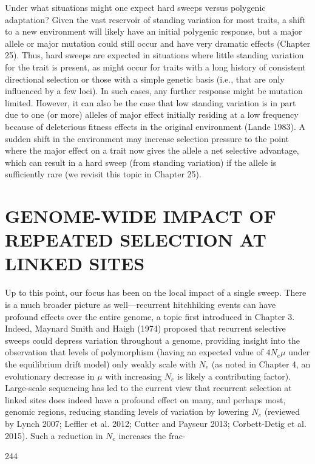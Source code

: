 \documentclass{article}
\begin{document}
Under what situations might one expect hard sweeps versus polygenic adaptation? Given the vast reservoir of standing variation for most traits, a shift to a new environment will likely have an initial polygenic response, but a major allele or major mutation could still occur and have very dramatic effects (Chapter 25). Thus, hard sweeps are expected in situations where little standing variation for the trait is present, as might occur for traits with a long history of consistent directional selection or those with a simple genetic basis (i.e., that are only influenced by a few loci). In such cases, any further response might be mutation limited. However, it can also be the case that low standing variation is in part due to one (or more) alleles of major effect initially residing at a low frequency because of deleterious fitness effects in the original environment (Lande 1983). A sudden shift in the environment may increase selection pressure to the point where the major effect on a trait now gives the allele a net selective advantage, which can result in a hard sweep (from standing variation) if the allele is sufficiently rare (we revisit this topic in Chapter 25).

\section{GENOME-WIDE IMPACT OF REPEATED SELECTION AT LINKED SITES}
Up to this point, our focus has been on the local impact of a single sweep. There is a much broader picture as well—recurrent hitchhiking events can have profound effects over the entire genome, a topic first introduced in Chapter 3. Indeed, Maynard Smith and Haigh (1974) proposed that recurrent selective sweeps could depress variation throughout a genome, providing insight into the observation that levels of polymorphism (having an expected value of  $ 4N_{e}\mu $ under the equilibrium drift model) only weakly scale with  $ N_{e} $ (as noted in Chapter 4, an evolutionary decrease in  $ \mu $ with increasing  $ N_{e} $ is likely a contributing factor). Large-scale sequencing has led to the current view that recurrent selection at linked sites does indeed have a profound effect on many, and perhaps most, genomic regions, reducing standing levels of variation by lowering  $ N_{e} $ (reviewed by Lynch 2007; Leffler et al. 2012; Cutter and Payseur 2013; Corbett-Detig et al. 2015). Such a reduction in  $ N_{e} $ increases the frac-

244
\end{document}
